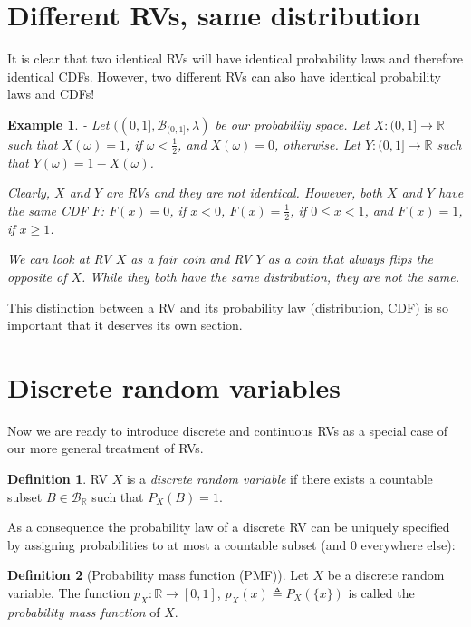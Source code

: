 \documentclass{book}
\theoremstyle{plain}%
\newtheorem{prototheorem}{Example}[section]
\newenvironment{cexample}
   {\colorlet{shadecolor}{gray!10}\begin{shaded}\begin{prototheorem}}
   {\end{prototheorem}\end{shaded}}
\theoremstyle{definition}
\newtheorem{definition}{Definition}[section]
\newlength{\arrow}
\begin{document}
\section{Different RVs, same distribution}

It is clear that two identical RVs will have identical probability laws and therefore identical CDFs. However, two different RVs can also have identical probability laws and CDFs! 

\begin{cexample}{}{-}
Let $((0, 1], \mathcal{B}_{(0,1]}, \lambda)$ be our probability space. Let $X: (0, 1] \to \mathbb{R}$ such that $X(\omega) = 1$, if $\omega < \frac{1}{2}$, and $X(\omega) = 0$, otherwise. Let $Y: (0, 1] \to \mathbb{R}$ such that $Y(\omega) = 1 - X(\omega)$.

Clearly, $X$ and $Y$ are RVs and they are not identical. However, both $X$ and $Y$ have the same CDF $F$: $F(x) = 0$, if $x < 0$, $F(x) = \frac{1}{2}$, if $0 \leq x < 1$, and $F(x) = 1$, if $x \geq 1$.

We can look at RV $X$ as a fair coin and RV $Y$ as a coin that always flips the opposite of $X$. While they both have the same distribution, they are not the same.
\end{cexample}

This distinction between a RV and its probability law (distribution, CDF) is so important that it deserves its own section.

\section{Discrete random variables}

Now we are ready to introduce discrete and continuous RVs as a special case of our more general treatment of RVs.

\begin{definition}
RV $X$ is a \emph{discrete random variable} if there exists a countable subset $B \in \mathcal{B}_\mathbb{R}$ such that $P_X(B) = 1$.
\end{definition}

As a consequence the probability law of a discrete RV can be uniquely specified by assigning probabilities to at most a countable subset (and 0 everywhere else):

\begin{definition}[Probability mass function (PMF)]
Let $X$ be a discrete random variable. The function $p_X: \mathbb{R} \rightarrow [0,1]$, $p_X(x) \triangleq P_X(\{x\})$ is called the \emph{probability mass function} of $X$.
\end{definition}
\end{document}
